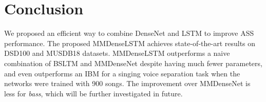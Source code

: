 \documentclass{article}
\begin{document}
\section{Conclusion}
\label{sec:concl}
We proposed an efficient way to combine DenseNet and LSTM to improve ASS performance. The proposed MMDenseLSTM achieves state-of-the-art results on DSD100 and MUSDB18 datasets. MMDenseLSTM outperforms a naive combination of BSLTM and MMDenseNet despite having much fewer parameters, and even outperforms an IBM for a singing voice separation task when the networks were trained with 900 songs. The improvement over MMDenseNet is less for {\it bass}, which will be further investigated in future.














































\end{document}
